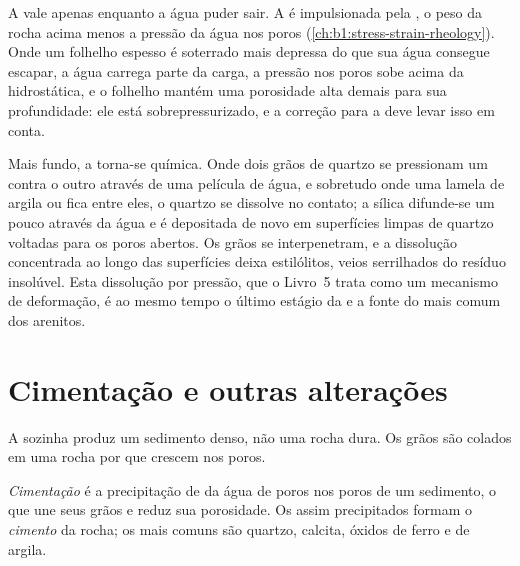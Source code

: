 A  vale apenas enquanto a água puder sair. A  é impulsionada pela
, o peso da rocha acima menos a pressão da água nos poros
(\cref{ch:b1:stress-strain-rheology}). Onde um folhelho espesso é soterrado mais depressa do
que sua água consegue escapar, a água carrega parte da carga, a pressão nos poros sobe acima
da hidrostática, e o folhelho mantém uma porosidade alta demais para sua profundidade: ele
está sobrepressurizado, e a correção para a  deve levar isso em conta.

Mais fundo, a  torna-se química. Onde dois grãos de quartzo se pressionam um
contra o outro através de uma película de água, e sobretudo onde uma lamela de argila ou
 fica entre eles, o quartzo se dissolve no contato; a sílica difunde-se um pouco através
da água e é depositada de novo em superfícies limpas de quartzo voltadas para os poros
abertos. Os grãos se interpenetram, e a dissolução concentrada ao longo das superfícies deixa
estilólitos, veios serrilhados do resíduo insolúvel. Esta dissolução por pressão, que o
Livro~5 trata como um mecanismo de deformação, é ao mesmo tempo o último estágio da
 e a fonte do  mais comum dos arenitos.

\section{Cimentação e outras alterações}\label{sec:b1:diagenesis-basins:cementation}

A  sozinha produz um sedimento denso, não uma rocha dura. Os grãos são colados
em uma rocha por  que crescem nos poros.

\begin{definition}\label{def:b1:diagenesis-basins:cement}
\emph{Cimentação} é a precipitação de  da água de poros nos poros
de um sedimento, o que une seus grãos e reduz sua porosidade. Os  assim
precipitados formam o \emph{cimento} da rocha; os mais comuns são quartzo,
calcita, óxidos de ferro e  de argila.
\end{definition}


